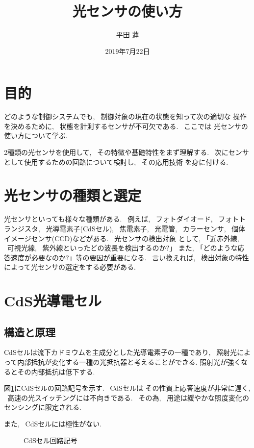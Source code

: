 \documentclass[titlepage]{jsarticle}
\title{光センサの使い方}
\author{平田 蓮}
\date{2019年7月22日}
\begin{document}
\maketitle
\section{目的}
    どのような制御システムでも, ~制御対象の現在の状態を知って次の適切な
    操作を決めるために, ~状態を計測するセンサが不可欠である. ~ここでは
    光センサの使い方について学ぶ.

    2種類の光センサを使用して, ~その特徴や基礎特性をまず理解する.
    ~次にセンサとして使用するための回路について検討し, ~その応用技術
    を身に付ける.

\section{光センサの種類と選定}
    光センサといっても様々な種類がある. ~例えば, ~フォトダイオード,
    ~フォトトランジスタ, ~光導電素子(CdSセル), ~焦電素子, ~光電管,
    ~カラーセンサ, ~個体イメージセンサ(CCD)などがある. ~光センサの検出対象
    として, 「近赤外線, ~可視光線, ~紫外線といったどの波長を検出するのか?」
    また, 「どのような応答速度が必要なのか?」等の要因が重要になる.
    ~言い換えれば, ~検出対象の特性によって光センサの選定をする必要がある.

\section{CdS光導電セル}
    \subsection{構造と原理}
        CdSセルは流下カドミウムを主成分とした光導電素子の一種であり,
        ~照射光によって内部抵抗が変化する一種の光抵抗器と考えることができる.
        照射光が強くなるとその内部抵抗は低下する.

        図\ref{fig:CdS}にCdSセルの回路記号を示す. ~CdSセルは
        その性質上応答速度が非常に遅く, ~高速の光スイッチングには不向きである.
        ~その為, ~用途は緩やかな照度変化のセンシングに限定される.
        
        また, ~CdSセルには極性がない.

        \begin{figure}[ht]
            \centering
            \caption{CdSセル回路記号}
            \label{fig:CdS}
        \end{figure}
\end{document}
